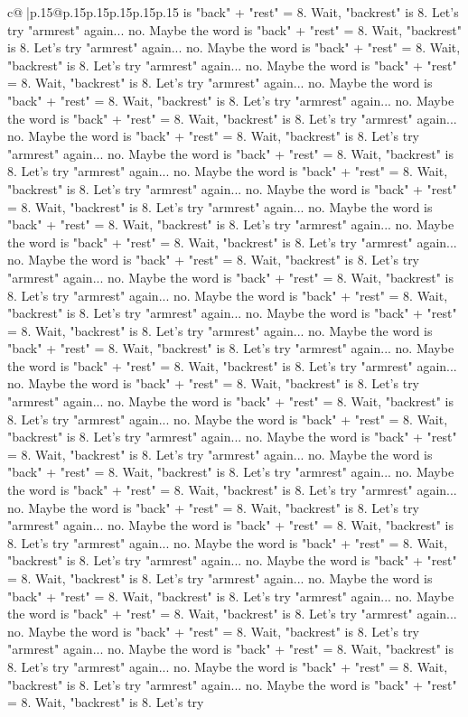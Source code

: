 \documentclass{article}
\begin{document}
{\begin{supertabular}{c@{$\;$}|p{.15\linewidth}@{}p{.15\linewidth}p{.15\linewidth}p{.15\linewidth}p{.15\linewidth}p{.15\linewidth}}
{{{is "back" + "rest" = 8. Wait, "backrest" is 8. Let's try "armrest" again... no. Maybe the word is "back" + "rest" = 8. Wait, "backrest" is 8. Let's try "armrest" again... no. Maybe the word is "back" + "rest" = 8. Wait, "backrest" is 8. Let's try "armrest" again... no. Maybe the word is "back" + "rest" = 8. Wait, "backrest" is 8. Let's try "armrest" again... no. Maybe the word is "back" + "rest" = 8. Wait, "backrest" is 8. Let's try "armrest" again... no. Maybe the word is "back" + "rest" = 8. Wait, "backrest" is 8. Let's try "armrest" again... no. Maybe the word is "back" + "rest" = 8. Wait, "backrest" is 8. Let's try "armrest" again... no. Maybe the word is "back" + "rest" = 8. Wait, "backrest" is 8. Let's try "armrest" again... no. Maybe the word is "back" + "rest" = 8. Wait, "backrest" is 8. Let's try "armrest" again... no. Maybe the word is "back" + "rest" = 8. Wait, "backrest" is 8. Let's try "armrest" again... no. Maybe the word is "back" + "rest" = 8. Wait, "backrest" is 8. Let's try "armrest" again... no. Maybe the word is "back" + "rest" = 8. Wait, "backrest" is 8. Let's try "armrest" again... no. Maybe the word is "back" + "rest" = 8. Wait, "backrest" is 8. Let's try "armrest" again... no. Maybe the word is "back" + "rest" = 8. Wait, "backrest" is 8. Let's try "armrest" again... no. Maybe the word is "back" + "rest" = 8. Wait, "backrest" is 8. Let's try "armrest" again... no. Maybe the word is "back" + "rest" = 8. Wait, "backrest" is 8. Let's try "armrest" again... no. Maybe the word is "back" + "rest" = 8. Wait, "backrest" is 8. Let's try "armrest" again... no. Maybe the word is "back" + "rest" = 8. Wait, "backrest" is 8. Let's try "armrest" again... no. Maybe the word is "back" + "rest" = 8. Wait, "backrest" is 8. Let's try "armrest" again... no. Maybe the word is "back" + "rest" = 8. Wait, "backrest" is 8. Let's try "armrest" again... no. Maybe the word is "back" + "rest" = 8. Wait, "backrest" is 8. Let's try "armrest" again... no. Maybe the word is "back" + "rest" = 8. Wait, "backrest" is 8. Let's try "armrest" again... no. Maybe the word is "back" + "rest" = 8. Wait, "backrest" is 8. Let's try "armrest" again... no. Maybe the word is "back" + "rest" = 8. Wait, "backrest" is 8. Let's try "armrest" again... no. Maybe the word is "back" + "rest" = 8. Wait, "backrest" is 8. Let's try "armrest" again... no. Maybe the word is "back" + "rest" = 8. Wait, "backrest" is 8. Let's try "armrest" again... no. Maybe the word is "back" + "rest" = 8. Wait, "backrest" is 8. Let's try "armrest" again... no. Maybe the word is "back" + "rest" = 8. Wait, "backrest" is 8. Let's try "armrest" again... no. Maybe the word is "back" + "rest" = 8. Wait, "backrest" is 8. Let's try "armrest" again... no. Maybe the word is "back" + "rest" = 8. Wait, "backrest" is 8. Let's try "armrest" again... no. Maybe the word is "back" + "rest" = 8. Wait, "backrest" is 8. Let's try "armrest" again... no. Maybe the word is "back" + "rest" = 8. Wait, "backrest" is 8. Let's try "armrest" again... no. Maybe the word is "back" + "rest" = 8. Wait, "backrest" is 8. Let's try "armrest" again... no. Maybe the word is "back" + "rest" = 8. Wait, "backrest" is 8. Let's try }}}
\end{supertabular}}
\end{document}
